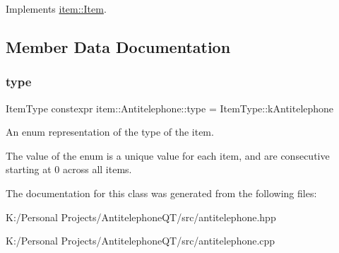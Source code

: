 Implements \hyperlink{classitem_1_1_item_afef6bdd5c1c734c67122e4118e9e1930}{item\+::\+Item}.



\subsection{Member Data Documentation}
\mbox{\label{classitem_1_1_antitelephone_ab6d34885da8ab27a578da87a0c746744}} 
\subsubsection{\texorpdfstring{type}{type}}
{\footnotesize\ttfamily Item\+Type constexpr item\+::\+Antitelephone\+::type = Item\+Type\+::k\+Antitelephone\hspace{0.3cm}{\ttfamily [static]}}



An enum representation of the type of the item. 

The value of the enum is a unique value for each item, and are consecutive starting at 0 across all items. 

The documentation for this class was generated from the following files\+:\begin{DoxyCompactItemize}
\item 
K\+:/\+Personal Projects/\+Antitelephone\+Q\+T/src/antitelephone.\+hpp\item 
K\+:/\+Personal Projects/\+Antitelephone\+Q\+T/src/antitelephone.\+cpp\end{DoxyCompactItemize}
